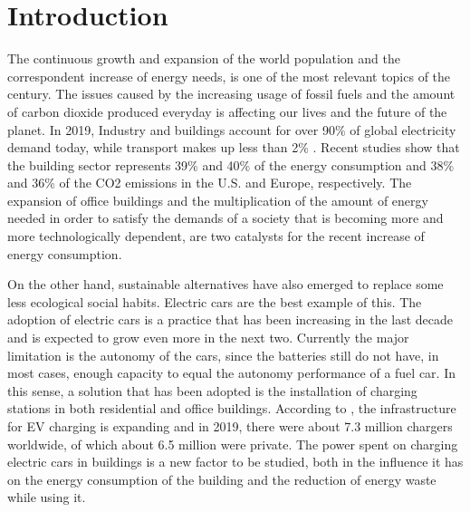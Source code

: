 \chapter{Introduction}
\label{chap:intro}

The continuous growth and expansion of the world population and the correspondent increase of energy needs, is one of the most relevant topics of the century. The issues caused by the increasing usage of fossil fuels and the amount of carbon dioxide produced everyday is affecting our lives and the future of the planet. In 2019, Industry and buildings account for over 90\% of global electricity demand today, while transport makes up less than 2\% \cite{iea}. Recent studies show that the building sector represents 39\% and 40\% of the energy consumption and 38\% and 36\% of the CO2 emissions in the U.S. \cite{CivilUS} and Europe\cite{CivilEU}, respectively. The expansion of office buildings and the multiplication of the amount of energy needed in order to satisfy the demands of a society that is becoming more and more technologically dependent, are two catalysts for the recent increase of energy consumption. 



On the other hand, sustainable alternatives have also emerged to replace some less ecological social habits. Electric cars are the best example of this. The adoption of electric cars is a practice that has been increasing in the last decade and is expected to grow even more in the next two. Currently the major limitation is the autonomy of the cars, since the batteries still do not have, in most cases, enough capacity to equal the autonomy performance of a fuel car. In this sense, a solution that has been adopted is the installation of charging stations in both residential and office buildings. According to \cite{charger}, the infrastructure for \ac{EV} charging is expanding and in 2019, there were about 7.3 million chargers worldwide, of which about 6.5 million were private. The power spent on charging electric cars in buildings is a new factor to be studied, both in the influence it has on the energy consumption of the building and the reduction of energy waste while using it.


